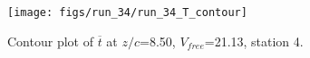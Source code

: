 \begin{figure}[H]
\centering
\texttt{[image: figs/run\_34/run\_34\_T\_contour]}
\caption{Contour plot of $\overline{t}$ at $z/c$=8.50, $V_{free}$=21.13, station 4.}
\label{fig:run_34_T_contour}
\end{figure}


